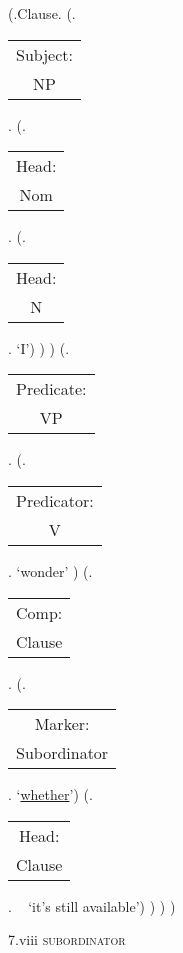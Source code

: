 \documentclass[12pt,letterpaper]{article}
\begin{document}
\begin{figure}
\begin{center}
\begin{parsetree}
			\hfill \break\hfill \break
			(.Clause.
			(.\begin{tabular}{c}Subject:\\NP\end{tabular}.
			(.\begin{tabular}{c}Head:\\Nom\end{tabular}.
			(.\begin{tabular}{c}Head:\\N\end{tabular}. `I')
			)
			)
			(.\begin{tabular}{c}Predicate:\\VP\end{tabular}.
			(.\begin{tabular}{c}Predicator:\\V\end{tabular}. `wonder' )
			(.\begin{tabular}{c}Comp:\\Clause\end{tabular}.
			(.\begin{tabular}{c}Marker:\\Subordinator\end{tabular}. `\underline{whether}')
			(.\begin{tabular}{c}Head:\\Clause\end{tabular}. ~ `it{'s still available}')
			)
			)
			)
			
			\hfill \break\hfill \break
		\end{parsetree}
		7.viii \textsc{subordinator}
	\end{center}
\end{figure}
\end{document}
